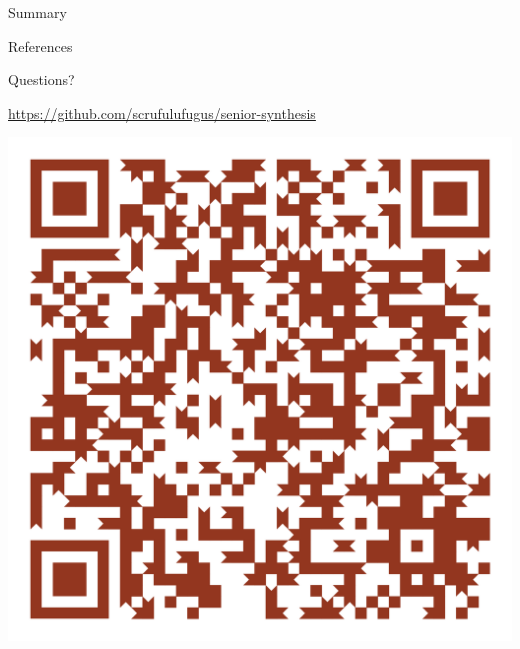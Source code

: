 \documentclass[aspectratio=169,t]{beamer}
\begin{document}
\begin{frame}[label={sec:org8301766}]{Summary}
\setcounter{tocdepth}{2}
\tableofcontents
\end{frame}

\begin{frame}[allowframebreaks,label=]{References}
\nocite{*}


\end{frame}

\begin{frame}[label={sec:org71dd611}]{Questions?}
\begin{center}
\url{https://github.com/scrufulufugus/senior-synthesis}

\includegraphics[height=0.70\textheight]{./Figs/qr.png}
\end{center}
\end{frame}
\end{document}
